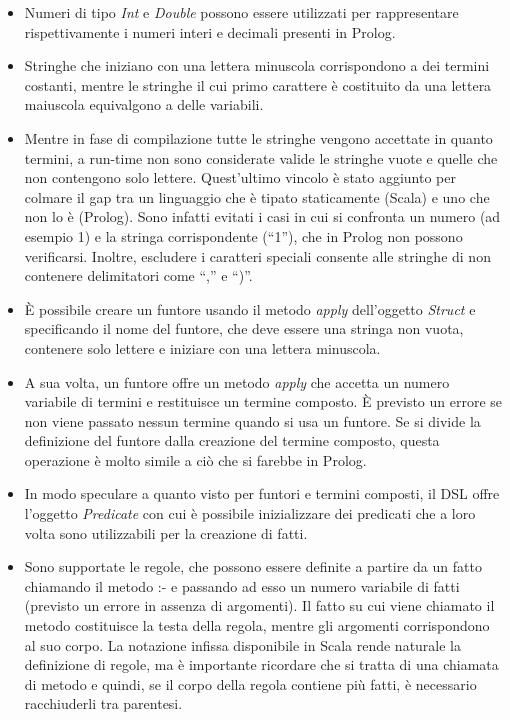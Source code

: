 \begin{itemize}
\item Numeri di tipo \textit{Int} e \textit{Double} possono essere utilizzati per rappresentare rispettivamente i numeri interi e decimali presenti in Prolog.
\item Stringhe che iniziano con una lettera minuscola corrispondono a dei termini costanti, mentre le stringhe il cui primo carattere è costituito da una lettera maiuscola equivalgono a delle variabili.
\item Mentre in fase di compilazione tutte le stringhe vengono accettate in quanto termini, a run-time non sono considerate valide le stringhe vuote e quelle che non contengono solo lettere. Quest'ultimo vincolo è stato aggiunto per colmare il gap tra un linguaggio che è tipato staticamente (Scala) e uno che non lo è (Prolog). Sono infatti evitati i casi in cui si confronta un numero (ad esempio 1) e la stringa corrispondente (``1''), che in Prolog non possono verificarsi. Inoltre, escludere i caratteri speciali consente alle stringhe di non contenere delimitatori come ``,'' e ``)''.
\item È possibile creare un funtore usando il metodo \textit{apply} dell'oggetto \textit{Struct} e specificando il nome del funtore, che deve essere una stringa non vuota, contenere solo lettere e iniziare con una lettera minuscola.
\item A sua volta, un funtore offre un metodo \textit{apply} che accetta un numero variabile di termini e restituisce un termine composto. È previsto un errore se non viene passato nessun termine quando si usa un funtore. Se si divide la definizione del funtore dalla creazione del termine composto, questa operazione è molto simile a ciò che si farebbe in Prolog.


\item In modo speculare a quanto visto per funtori e termini composti, il DSL offre l'oggetto \textit{Predicate} con cui è possibile inizializzare dei predicati che a loro volta sono utilizzabili per la creazione di fatti.
\item Sono supportate le regole, che possono essere definite a partire da un fatto chiamando il metodo :- e passando ad esso un numero variabile di fatti (previsto un errore in assenza di argomenti). Il fatto su cui viene chiamato il metodo costituisce la testa della regola, mentre gli argomenti corrispondono al suo corpo. La notazione infissa disponibile in Scala rende naturale la definizione di regole, ma è importante ricordare che si tratta di una chiamata di metodo e quindi, se il corpo della regola contiene più fatti, è necessario racchiuderli tra parentesi.


\end{itemize}
